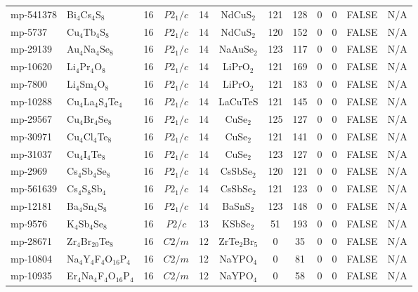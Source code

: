 {\begin{longtable}{llcccccccccc}
    mp-541378 & Bi$_{4}$Cs$_{4}$S$_{8}$ & 16    & $P2_1/c$ & 14    & NdCuS$_{2}$ & 121   & 128   & 0     & 0     & FALSE & N/A \\
    mp-5737 & Cu$_{4}$Tb$_{4}$S$_{8}$ & 16    & $P2_1/c$ & 14    & NdCuS$_{2}$ & 120   & 152   & 0     & 0     & FALSE & N/A \\
    mp-29139 & Au$_{4}$Na$_{4}$Se$_{8}$ & 16    & $P2_1/c$ & 14    & NaAuSe$_{2}$ & 123   & 117   & 0     & 0     & FALSE & N/A \\
    mp-10620 & Li$_{4}$Pr$_{4}$O$_{8}$ & 16    & $P2_1/c$ & 14    & LiPrO$_{2}$ & 121   & 169   & 0     & 0     & FALSE & N/A \\
    mp-7800 & Li$_{4}$Sm$_{4}$O$_{8}$ & 16    & $P2_1/c$ & 14    & LiPrO$_{2}$ & 121   & 183   & 0     & 0     & FALSE & N/A \\
    mp-10288 & Cu$_{4}$La$_{4}$S$_{4}$Te$_{4}$ & 16    & $P2_1/c$ & 14    & LaCuTeS & 121   & 145   & 0     & 0     & FALSE & N/A \\
    mp-29567 & Cu$_{4}$Br$_{4}$Se$_{8}$ & 16    & $P2_1/c$ & 14    & CuSe$_{2}$ & 125   & 127   & 0     & 0     & FALSE & N/A \\
    mp-30971 & Cu$_{4}$Cl$_{4}$Te$_{8}$ & 16    & $P2_1/c$ & 14    & CuSe$_{2}$ & 121   & 141   & 0     & 0     & FALSE & N/A \\
    mp-31037 & Cu$_{4}$I$_{4}$Te$_{8}$ & 16    & $P2_1/c$ & 14    & CuSe$_{2}$ & 123   & 127   & 0     & 0     & FALSE & N/A \\
    mp-2969 & Cs$_{4}$Sb$_{4}$Se$_{8}$ & 16    & $P2_1/c$ & 14    & CsSbSe$_{2}$ & 120   & 121   & 0     & 0     & FALSE & N/A \\
    mp-561639 & Cs$_{4}$S$_{8}$Sb$_{4}$ & 16    & $P2_1/c$ & 14    & CsSbSe$_{2}$ & 121   & 123   & 0     & 0     & FALSE & N/A \\
    mp-12181 & Ba$_{4}$Sn$_{4}$S$_{8}$ & 16    & $P2_1/c$ & 14    & BaSnS$_{2}$ & 123   & 148   & 0     & 0     & FALSE & N/A \\
    mp-9576 & K$_{4}$Sb$_{4}$Se$_{8}$ & 16    & $P2/c$ & 13    & KSbSe$_{2}$ & 51    & 193   & 0     & 0     & FALSE & N/A \\
    mp-28671 & Zr$_{4}$Br$_{20}$Te$_{8}$ & 16    & $C2/m$ & 12    & ZrTe$_{2}$Br$_{5}$ & 0     & 35    & 0     & 0     & FALSE & N/A \\
    mp-10804 & Na$_{4}$Y$_{4}$F$_{4}$O$_{16}$P$_{4}$ & 16    & $C2/m$ & 12    & NaYPO$_{4}$ & 0     & 81    & 0     & 0     & FALSE & N/A \\
    mp-10935 & Er$_{4}$Na$_{4}$F$_{4}$O$_{16}$P$_{4}$ & 16    & $C2/m$ & 12    & NaYPO$_{4}$ & 0     & 58    & 0     & 0     & FALSE & N/A \\

\end{longtable}}
